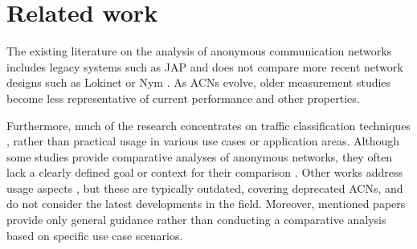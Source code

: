 \chapter{Related work}

The existing literature on the analysis of anonymous communication networks includes legacy systems such as JAP and does not compare more recent network designs such as Lokinet or Nym \cite{analysis-acn-usage-jap-old, analysis-tools-usage-jap, analysis-classification-jap, analysis-phd-thesis-identification-jap, analysis-packet-momentum-identification-jap, analysis-hierarchical-traffic-classification-jap}. As ACNs evolve, older measurement studies become less representative of current performance and other properties.

Furthermore, much of the research concentrates on traffic classification techniques \cite{analysis-classification-jap, analysis-hierarchical-traffic-classification-jap, analysis-packet-momentum-identification-jap, analysis-phd-thesis-identification-jap}, rather than practical usage in various use cases or application areas. Although some studies provide comparative analyses of anonymous networks, they often lack a clearly defined goal or context for their comparison \cite{analysis-tor-vs-i2p}. Other works address usage aspects \cite{analysis-tools-usage-jap, analysis-acn-usage-jap-old}, but these are typically outdated, covering deprecated ACNs, and do not consider the latest developments in the field. Moreover, mentioned papers provide only general guidance rather than conducting a comparative analysis based on specific use case scenarios.

